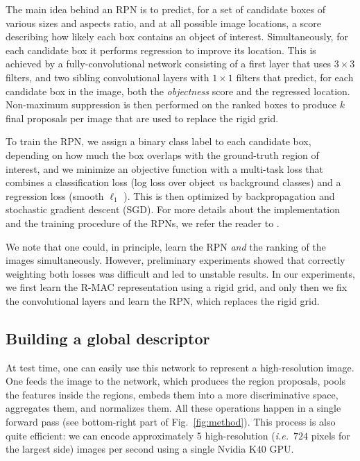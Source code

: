 \documentclass[runningheads]{llncs}
\def\ie{\emph{i.e.}~}
\begin{document}
The main idea behind an RPN is to predict, for a set of candidate boxes of various sizes and aspects ratio, and at all possible image locations,
a score describing how likely each box contains an object of interest.
Simultaneously, for each candidate box it performs regression to improve its location.
This is achieved by a fully-convolutional network consisting of a first layer that uses $3\times 3$ filters, and two sibling convolutional layers with $1\times 1$ filters that predict, for each candidate box in the image, both the \emph{objectness} score and the regressed location. Non-maximum suppression is then performed on the ranked boxes to produce $k$ final proposals per image that are used to replace the rigid grid.

To train the RPN, we assign a binary class label to each candidate box, depending on how much
the box overlaps with the ground-truth region of interest, and we minimize an objective function with a multi-task loss that combines a
classification loss (log loss over object \emph{vs} background classes)
and a regression loss (smooth $\ell_1$ \cite{Girshick2015}). This is then optimized by backpropagation and
stochastic gradient descent (SGD). For more details about the implementation and the training procedure of the RPNs, we refer the reader to \cite{Ren2015faster}.

We note that one could, in principle, learn the RPN \emph{and} the ranking of the images simultaneously. However,
preliminary experiments showed that correctly weighting both losses was difficult and led to unstable results. 
In our experiments, we first learn the R-MAC representation using a rigid grid, and only then we fix the convolutional layers and learn the RPN, which replaces the rigid grid.

\subsection{Building a global descriptor}
\label{sec:globaldesc}
At test time, one can easily use this network to represent a high-resolution image. 
One feeds the image to the network, which produces the region proposals, pools the features inside the
regions, embeds them into a more discriminative space, aggregates them, and normalizes them. All these operations happen in a single forward pass
(see bottom-right part of Fig.~\ref{fig:method}). This process is also quite efficient: we can encode approximately 5 high-resolution (\ie $724$ pixels for the largest side) images per second using a single Nvidia K40 GPU.
\end{document}
